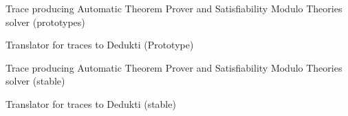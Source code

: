 \begin{workpackage}

\begin{wpdelivs}
  \begin{wpdeliv}[due=6,miles=startup,id=ATPtrace1,dissem=PU,nature=DEM,lead=Inr]
    {Trace producing Automatic Theorem Prover and Satisfiability Modulo Theories solver (prototypes)}
  \end{wpdeliv}

  \begin{wpdeliv}[due=18,miles=startup,id=Trace2Dedukti1,dissem=PU,nature=DEM,lead=Imt]
    {Translator for traces to Dedukti (Prototype)}
  \end{wpdeliv}

  \begin{wpdeliv}[due=48,miles=startup,id=ATPtrace2,dissem=PU,nature=DEM,lead=Inr]
    {Trace producing Automatic Theorem Prover and Satisfiability Modulo Theories solver (stable)}
  \end{wpdeliv}

  \begin{wpdeliv}[due=48,miles=startup,id=Trace2Dedukti2,dissem=PU,nature=DEM,lead=Imt]
    {Translator for traces to Dedukti (stable)}
  \end{wpdeliv}

\end{wpdelivs}
\end{workpackage}

